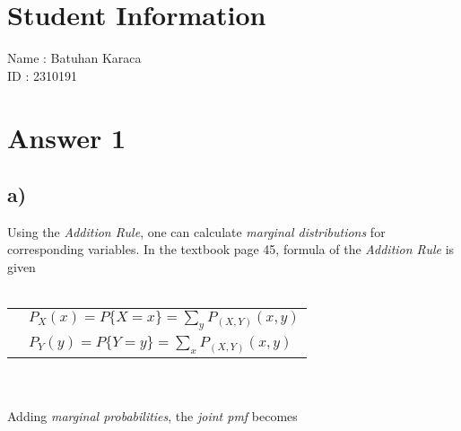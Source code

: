 \documentclass[12pt]{article}
\begin{document}
\section*{Student Information}

Name : Batuhan Karaca \\

ID : 2310191 \\


\section*{Answer 1}
\subsection*{a)}
Using the \textit{Addition Rule}, one can calculate \textit{marginal distributions} for corresponding variables.
In the textbook page 45, formula of the \hypertarget{addrule}{\textit{Addition Rule}} is given
\\ \\
\begin{tabular}{l l}
    & $P_X(x)=P\{X=x\}=\sum\limits_y P_{(X,Y)} (x,y)$\\
    & $P_Y(y)=P\{Y=y\}=\sum\limits_x P_{(X,Y)} (x,y)$\\
\end{tabular}
\\ \\
Adding \textit{marginal probabilities}, the \textit{joint pmf} becomes
\end{document}
